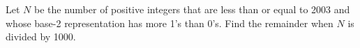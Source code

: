 Let $N$ be the number of positive integers that are less than or equal to 2003 and whose base-2 representation has more 1's than 0's.  Find the remainder when $N$ is divided by 1000.